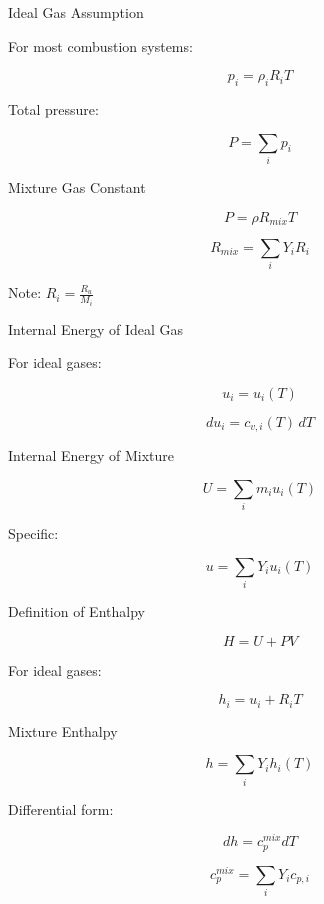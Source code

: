 \documentclass[aspectratio=169]{beamer}
\begin{document}
\begin{frame}{Ideal Gas Assumption}

For most combustion systems:

\[
p_i = \rho_i R_i T
\]

\pause

Total pressure:

\[
P = \sum_i p_i
\]

\end{frame}

\begin{frame}{Mixture Gas Constant}

\[
P = \rho R_{mix} T
\]

\[
R_{mix} = \sum_i Y_i R_i
\]

\pause

Note: $R_i = \frac{R_u}{M_i}$

\end{frame}

\begin{frame}{Internal Energy of Ideal Gas}

For ideal gases:

\[
u_i = u_i(T)
\]

\pause

\[
du_i = c_{v,i}(T)\, dT
\]

\end{frame}

\begin{frame}{Internal Energy of Mixture}

\[
U = \sum_i m_i u_i(T)
\]

\pause

Specific:

\[
u = \sum_i Y_i u_i(T)
\]

\end{frame}

\begin{frame}{Definition of Enthalpy}

\[
H = U + PV
\]

\pause

For ideal gases:

\[
h_i = u_i + R_i T
\]

\end{frame}

\begin{frame}{Mixture Enthalpy}

\[
h = \sum_i Y_i h_i(T)
\]

\pause

Differential form:

\[
dh = c_p^{mix} dT
\]

\[
c_p^{mix} = \sum_i Y_i c_{p,i}
\]

\end{frame}
\end{document}
